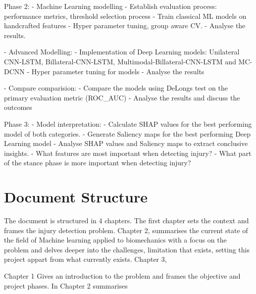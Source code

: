 Phase 2:
- Machine Learning modelling
    - Establish evaluation process: performance metrics, threshold selection process
    - Train classical ML models on handcrafted features
    - Hyper parameter tuning, group aware CV.
    - Analyse the results.

- Advanced Modelling:
    - Implementation of Deep Learning models: Unilateral CNN-LSTM, Billateral-CNN-LSTM, Multimodal-Billateral-CNN-LSTM and MC-DCNN
    - Hyper parameter tuning for models
    - Analyse the results

- Compare comparision:
    - Compare the models using DeLongs test on the primary evaluation metric (ROC_AUC)
    - Analyse the results and discuss the outcomes

Phase 3:
- Model interpretation:
    - Calculate SHAP values for the best performing model of both categories.
    - Generate Saliency maps for the best performing Deep Learning model
    - Analyse SHAP values and Saliency maps to extract conclusive insights.
        - What features are most important when detecting injury?
        - What part of the stance phase is more important when detecting injury?

\section{Document Structure}\label{sec:intro-structure}

The document is structured in 4 chapters. The first chapter sets the context and frames the injury detection problem. Chapter 2, summarises the current state of the field of Machine learning applied to biomechanics with a focus on the problem and delves deeper into the challenges, limitation that exists, setting this project appart from what currently exists. Chapter 3, 

Chapter 1 Gives an introduction to the problem and frames the objective and project phases. In Chapter 2 summarises  

